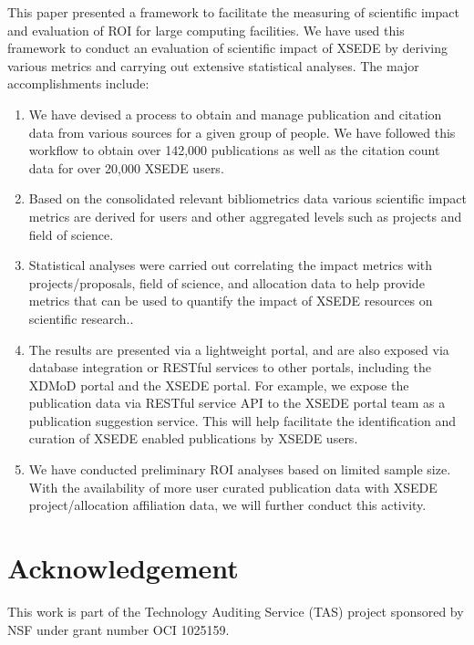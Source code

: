 \documentclass{sig-alternate}
\begin{document}
This paper presented a framework to facilitate the measuring of scientific impact and evaluation of ROI for large computing facilities. We have used this framework to conduct an evaluation of scientific impact of XSEDE by deriving various metrics and carrying out extensive statistical analyses. The major accomplishments include:
\begin{enumerate}
\item We have devised a process to obtain and manage publication and citation data from various sources for a given group of people. We have followed this workflow to obtain over 142,000 publications as well as the citation count data for over 20,000 XSEDE users.
\item Based on the consolidated relevant bibliometrics data various scientific impact metrics are derived for users and other aggregated levels such as projects and field of science.
\item Statistical analyses were carried out correlating the impact metrics with projects/proposals, field of science, and allocation data to help provide metrics that can be used to quantify the impact of XSEDE resources on scientific research..
\item The results are presented via a lightweight portal, and are also exposed via database integration or RESTful services to other portals, including the XDMoD portal and the XSEDE portal. For example, we expose the publication data via RESTful service API to the XSEDE portal team as a publication suggestion service. This will help facilitate the identification and curation of XSEDE enabled publications by XSEDE users.
\item We have conducted preliminary ROI analyses based on limited sample size. With the availability of more user curated publication data with XSEDE project/allocation affiliation data, we will further conduct this activity.
\end{enumerate} 

 
 
\section*{Acknowledgement} 
 
This work is part of the Technology Auditing Service (TAS) project sponsored by NSF under grant number OCI 1025159. 
 
 
 
% 
 
 
\end{document}

